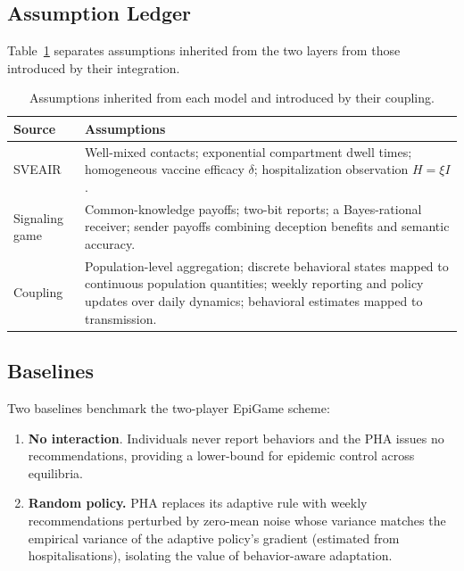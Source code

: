 \documentclass[sigconf,review]{acmart}
\begin{document}
\subsection{Assumption Ledger}
Table~\ref{tab:coupling-assumptions} separates assumptions inherited from the two layers from those introduced by their integration.
\begin{table}[h]
\centering
\caption{Assumptions inherited from each model and introduced
by their coupling.}
\label{tab:coupling-assumptions}
\small
\setlength{\tabcolsep}{3pt}
\renewcommand{\arraystretch}{1.02}
\begin{tabularx}{\columnwidth}{
@{}
>{\raggedright\arraybackslash}p{}
>{\raggedright\arraybackslash}X
@{}}
\toprule
\textbf{Source} & \textbf{Assumptions} \\
\midrule
SVEAIR
& Well-mixed contacts; exponential compartment dwell times;
homogeneous vaccine efficacy $\delta$;
hospitalization observation $H=\xi I$. \\
\midrule
Signaling game
& Common-knowledge payoffs; two-bit reports;
a Bayes-rational receiver; sender payoffs combining
deception benefits and semantic accuracy. \\
\midrule
Coupling
& Population-level aggregation; discrete behavioral states
mapped to continuous population quantities;
weekly reporting and policy updates over daily dynamics;
behavioral estimates mapped to transmission. \\
\bottomrule
\end{tabularx}
\end{table}

\subsection{Baselines} 
Two baselines benchmark the two-player EpiGame scheme:

\begin{enumerate}
\item {\bf No interaction}. Individuals never report behaviors and the PHA issues no recommendations, providing a lower-bound for epidemic control across equilibria.

\item {\bf Random policy.} PHA replaces its adaptive rule with weekly recommendations perturbed by zero-mean noise whose variance matches the empirical variance of the adaptive policy’s gradient (estimated from hospitalisations), isolating the value of behavior-aware adaptation.
\end{enumerate}
\end{document}
